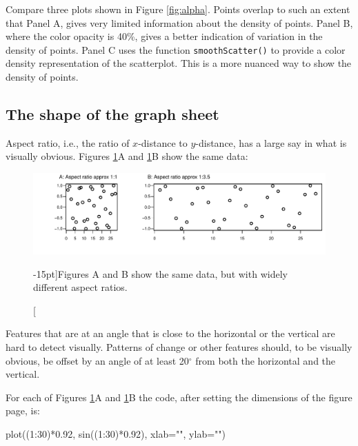 \documentclass{tufte-book}\usepackage[]{graphicx}\usepackage[]{color}
\newcommand{\txtt}[1]{\texttt{#1}}
\begin{document}
  Compare
three plots shown in Figure \ref{fig:alpha}.  Points overlap to such
an extent that Panel A, gives very limited information about the
density of points.  Panel B, where the color opacity is 40\%, gives a
better indication of variation in the density of points.  Panel C uses
the function \txtt{smoothScatter()} to provide a color density
representation of the scatterplot.  This is a more nuanced
way to show the density of points.

\subsection{The shape of the graph sheet}
Aspect ratio, i.e., the ratio of $x$-distance to $y$-distance, has a
large say in what is visually obvious.  Figures \ref{fig:aspect}A and
\ref{fig:aspect}B show the same data:
\begin{figure}
\begin{Schunk}


\centerline{\includegraphics[width=\textwidth]{figs/09-fig8_3e-1} }

\end{Schunk}
\caption[][-15pt]{Figures A and B show the same data, but with widely different
  aspect ratios.\label{fig:aspect}}
\end{figure}
\noindent
Features that are at an angle that is close to the horizontal or the
vertical are hard to detect visually. Patterns of change or other
features should, to be visually obvious, be offset by an angle of
at least 20$^\circ$ from both the horizontal and the vertical.

\noindent For each of Figures \ref{fig:aspect}A and \ref{fig:aspect}B
the code, after setting the dimensions of the figure page, is:
\begin{Schunk}
\begin{Sinput}
plot((1:30)*0.92, sin((1:30)*0.92),
     xlab="", ylab="")
\end{Sinput}
\end{Schunk}
\end{document}
